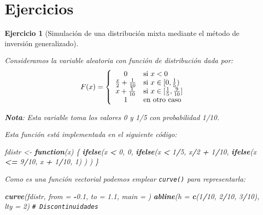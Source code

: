 \documentclass[
  spanish,
  10pt,
]{book}
\newenvironment{Shaded}{\begin{snugshade}}{\end{snugshade}}
\newcommand{\AttributeTok}[1]{\textcolor[rgb]{0.13,0.29,0.53}{#1}}
\newcommand{\CommentTok}[1]{\textcolor[rgb]{0.56,0.35,0.01}{\textit{#1}}}
\newcommand{\ControlFlowTok}[1]{\textcolor[rgb]{0.13,0.29,0.53}{\textbf{#1}}}
\newcommand{\DecValTok}[1]{\textcolor[rgb]{0.00,0.00,0.81}{#1}}
\newcommand{\FloatTok}[1]{\textcolor[rgb]{0.00,0.00,0.81}{#1}}
\newcommand{\FunctionTok}[1]{\textcolor[rgb]{0.13,0.29,0.53}{\textbf{#1}}}
\newcommand{\NormalTok}[1]{#1}
\newcommand{\OtherTok}[1]{\textcolor[rgb]{0.56,0.35,0.01}{#1}}
\newcommand{\SpecialCharTok}[1]{\textcolor[rgb]{0.81,0.36,0.00}{\textbf{#1}}}
\newcommand{\StringTok}[1]{\textcolor[rgb]{0.31,0.60,0.02}{#1}}
\theoremstyle{break}
\newtheorem{exercise}{Ejercicio}[chapter]
\theoremstyle{nonumberplain}
\renewcommand{\CommentTok}[1]{\textcolor[rgb]{0.41,0.41,0.41}{\texttt{#1}}}
\begin{document}
\section{Ejercicios}\label{ejercicios-discretas}

\begin{exercise}[Simulación de una distribución mixta mediante el método de inversión generalizado]
\protect\hypertarget{exr:mixta-cuantil}{}\label{exr:mixta-cuantil}

Consideramos la variable aleatoria con función de distribución dada por:
\[F(x)=\left\{
\begin{array}
[c]{cl}0 & \mbox{si $x<0$}\\
\frac{x}{2}+\frac{1}{10} & \mbox{si $x\in[0,\frac{1}{5})$}\\
x+\frac{1}{10} & \mbox{si $x\in[\frac{1}{5},\frac{9}{10}]$}\\
1 & \mbox{en otro caso}
\end{array}
\right.\]

\textbf{Nota}: Esta variable toma los valores 0 y 1/5 con probabilidad 1/10.

Esta función está implementada en el siguiente código:

\begin{Shaded}
\begin{Highlighting}[]
\NormalTok{fdistr }\OtherTok{\textless{}{-}} \ControlFlowTok{function}\NormalTok{(x) \{}
\FunctionTok{ifelse}\NormalTok{(x }\SpecialCharTok{\textless{}} \DecValTok{0}\NormalTok{, }\DecValTok{0}\NormalTok{,}
    \FunctionTok{ifelse}\NormalTok{(x }\SpecialCharTok{\textless{}} \DecValTok{1}\SpecialCharTok{/}\DecValTok{5}\NormalTok{, x}\SpecialCharTok{/}\DecValTok{2} \SpecialCharTok{+} \DecValTok{1}\SpecialCharTok{/}\DecValTok{10}\NormalTok{,}
        \FunctionTok{ifelse}\NormalTok{(x }\SpecialCharTok{\textless{}=} \DecValTok{9}\SpecialCharTok{/}\DecValTok{10}\NormalTok{, x }\SpecialCharTok{+} \DecValTok{1}\SpecialCharTok{/}\DecValTok{10}\NormalTok{, }\DecValTok{1}\NormalTok{) ) )}
\NormalTok{\}}
\end{Highlighting}
\end{Shaded}

Como es una función vectorial podemos emplear \texttt{curve()} para representarla:

\begin{Shaded}
\begin{Highlighting}[]
\FunctionTok{curve}\NormalTok{(fdistr, }\AttributeTok{from =} \SpecialCharTok{{-}}\FloatTok{0.1}\NormalTok{, }\AttributeTok{to =} \FloatTok{1.1}\NormalTok{, }\AttributeTok{main =} \StringTok{\textquotesingle{}\textquotesingle{}}\NormalTok{)}
\FunctionTok{abline}\NormalTok{(}\AttributeTok{h =} \FunctionTok{c}\NormalTok{(}\DecValTok{1}\SpecialCharTok{/}\DecValTok{10}\NormalTok{, }\DecValTok{2}\SpecialCharTok{/}\DecValTok{10}\NormalTok{, }\DecValTok{3}\SpecialCharTok{/}\DecValTok{10}\NormalTok{), }\AttributeTok{lty =} \DecValTok{2}\NormalTok{) }\CommentTok{\# Discontinuidades}
\end{Highlighting}
\end{Shaded}


\end{exercise}
\end{document}
